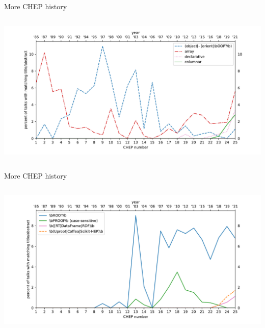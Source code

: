 \documentclass[aspectratio=169]{beamer}
\begin{document}
\begin{frame}{More CHEP history}
\vspace{0.15 cm}
\begin{columns}
\includegraphics[width=\linewidth]{PLOTS/chep-papers-paradigm.pdf}
\end{columns}
\end{frame}

\begin{frame}{More CHEP history}
\vspace{0.15 cm}
\begin{columns}
\includegraphics[width=\linewidth]{PLOTS/chep-papers-package-2.pdf}
\end{columns}
\end{frame}
\end{document}
